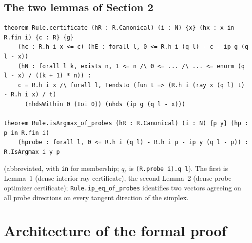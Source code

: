 \documentclass[11pt]{article}
\theoremstyle{definition}
\begin{document}
\subsection*{The two lemmas of Section 2}
\begin{verbatim}
theorem Rule.certificate (hR : R.Canonical) (i : N) {x} (hx : x in R.fin i) {c : R} {g}
    (hc : R.h i x <= c) (hE : forall l, 0 <= R.h i (q l) - c - ip g (q l - x))
    (hN : forall l k, exists n, 1 <= n /\ 0 <= ... /\ ... <= enorm (q l - x) / ((k + 1) * n)) :
    c = R.h i x /\ forall l, Tendsto (fun t => (R.h i (ray x (q l) t) - R.h i x) / t)
      (nhdsWithin 0 (Ioi 0)) (nhds (ip g (q l - x)))

theorem Rule.isArgmax_of_probes (hR : R.Canonical) (i : N) {p y} (hp : p in R.fin i)
    (hprobe : forall l, 0 <= R.h i (q l) - R.h i p - ip y (q l - p)) : R.IsArgmax i y p
\end{verbatim}
(abbreviated, with \texttt{in} for membership; $q_\ell$ is \texttt{(R.probe i).q l}). The first is Lemma~1 (dense interior-ray certificate), the second Lemma~2 (dense-probe optimizer certificate); \texttt{Rule.ip\_eq\_of\_probes} identifies two vectors agreeing on all probe directions on every tangent direction of the simplex.

\section{Architecture of the formal proof}
\end{document}
